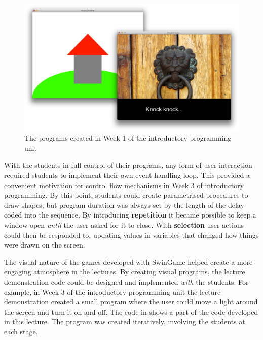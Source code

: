 

\begin{figure}[thb]
  \centering
  \includegraphics[width=\textwidth]{Week1Progs}
  \caption{The programs created in Week 1 of the introductory programming unit}
  \label{fig:week1_progs}
\end{figure}

With the students in full control of their programs, any form of user interaction required students to implement their own event handling loop. This provided a convenient motivation for control flow mechanisms in Week 3 of introductory programming. By this point, students could create parametrised procedures to draw shapes, but program duration was always set by the length of the delay coded into the sequence. By introducing \textbf{repetition} it became possible to keep a window open \emph{until} the user asked for it to close. With \textbf{selection} user actions could then be responded to, updating values in variables that changed how things were drawn on the screen.

The visual nature of the games developed with SwinGame helped create a more engaging atmosphere in the lectures. By creating visual programs, the lecture demonstration code could be designed and implemented \emph{with} the students. For example, in Week 3 of the introductory programming unit the lecture demonstration created a small program where the user could move a light around the screen and turn it on and off. The code in  shows a part of the code developed in this lecture. The program was created iteratively, involving the students at each stage.

